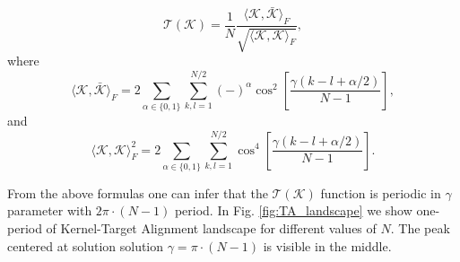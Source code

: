 \documentclass{article}
\begin{document}
\begin{equation}\label{eq:TKA_toy_model}
\mathcal{T}(\mathcal{K}) = \frac{1}{N}\frac{\langle \mathcal{K}, \bar{\mathcal{K}} \rangle_F}{\sqrt{\langle \mathcal{K}, \mathcal{K} \rangle_F}},
\end{equation}
where
\begin{equation}
    \langle \mathcal{K}, \bar{\mathcal{K}} \rangle_F = 2 \sum_{\alpha \in \{0,1\}} \sum_{k,l=1}^{N/2} (-)^{\alpha} \cos^2\left[ \frac{\gamma (k-l+\alpha/2)}{N-1} \right],
\end{equation}
and
\begin{equation}
    \langle \mathcal{K}, \mathcal{K} \rangle_F^2=2\sum_{\alpha \in \{0,1\} } \sum_{k,l=1}^{N/2} \cos^4\left[ \frac{\gamma(k-l+\alpha/2)}{N-1}\right].
\end{equation}

From the above formulas one can infer that the $\mathcal{T}(\mathcal{K})$ function is periodic in $\gamma$ parameter with $2\pi\cdot(N-1)$ period. In Fig. \ref{fig:TA_landscape} we show one-period of Kernel-Target Alignment landscape for different values of $N$. The peak centered at solution solution $\gamma = \pi \cdot (N-1)$ is visible in the middle.
\end{document}
